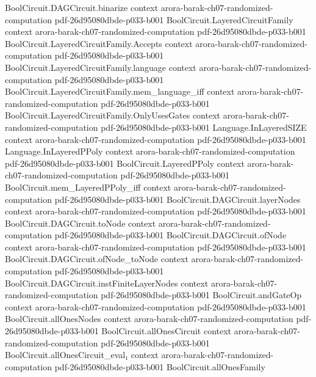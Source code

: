\begin{theorem}
\proofstep
  {BoolCircuit.DAGCircuit.binarize}
  {context}
  {arora-barak-ch07-randomized-computation}
  {pdf-26d95080dbde-p033-b001}
\proofstep
  {BoolCircuit.LayeredCircuitFamily}
  {context}
  {arora-barak-ch07-randomized-computation}
  {pdf-26d95080dbde-p033-b001}
\proofstep
  {BoolCircuit.LayeredCircuitFamily.Accepts}
  {context}
  {arora-barak-ch07-randomized-computation}
  {pdf-26d95080dbde-p033-b001}
\proofstep
  {BoolCircuit.LayeredCircuitFamily.language}
  {context}
  {arora-barak-ch07-randomized-computation}
  {pdf-26d95080dbde-p033-b001}
\proofstep
  {BoolCircuit.LayeredCircuitFamily.mem_language_iff}
  {context}
  {arora-barak-ch07-randomized-computation}
  {pdf-26d95080dbde-p033-b001}
\proofstep
  {BoolCircuit.LayeredCircuitFamily.OnlyUsesGates}
  {context}
  {arora-barak-ch07-randomized-computation}
  {pdf-26d95080dbde-p033-b001}
\proofstep
  {Language.InLayeredSIZE}
  {context}
  {arora-barak-ch07-randomized-computation}
  {pdf-26d95080dbde-p033-b001}
\proofstep
  {Language.InLayeredPPoly}
  {context}
  {arora-barak-ch07-randomized-computation}
  {pdf-26d95080dbde-p033-b001}
\proofstep
  {BoolCircuit.LayeredPPoly}
  {context}
  {arora-barak-ch07-randomized-computation}
  {pdf-26d95080dbde-p033-b001}
\proofstep
  {BoolCircuit.mem_LayeredPPoly_iff}
  {context}
  {arora-barak-ch07-randomized-computation}
  {pdf-26d95080dbde-p033-b001}
\proofstep
  {BoolCircuit.DAGCircuit.layerNodes}
  {context}
  {arora-barak-ch07-randomized-computation}
  {pdf-26d95080dbde-p033-b001}
\proofstep
  {BoolCircuit.DAGCircuit.toNode}
  {context}
  {arora-barak-ch07-randomized-computation}
  {pdf-26d95080dbde-p033-b001}
\proofstep
  {BoolCircuit.DAGCircuit.ofNode}
  {context}
  {arora-barak-ch07-randomized-computation}
  {pdf-26d95080dbde-p033-b001}
\proofstep
  {BoolCircuit.DAGCircuit.ofNode_toNode}
  {context}
  {arora-barak-ch07-randomized-computation}
  {pdf-26d95080dbde-p033-b001}
\proofstep
  {BoolCircuit.DAGCircuit.instFiniteLayerNodes}
  {context}
  {arora-barak-ch07-randomized-computation}
  {pdf-26d95080dbde-p033-b001}
\proofstep
  {BoolCircuit.andGateOp}
  {context}
  {arora-barak-ch07-randomized-computation}
  {pdf-26d95080dbde-p033-b001}
\proofstep
  {BoolCircuit.allOnesNodes}
  {context}
  {arora-barak-ch07-randomized-computation}
  {pdf-26d95080dbde-p033-b001}
\proofstep
  {BoolCircuit.allOnesCircuit}
  {context}
  {arora-barak-ch07-randomized-computation}
  {pdf-26d95080dbde-p033-b001}
\proofstep
  {BoolCircuit.allOnesCircuit_eval₁}
  {context}
  {arora-barak-ch07-randomized-computation}
  {pdf-26d95080dbde-p033-b001}
\proofstep
  {BoolCircuit.allOnesFamily}

\end{theorem}
